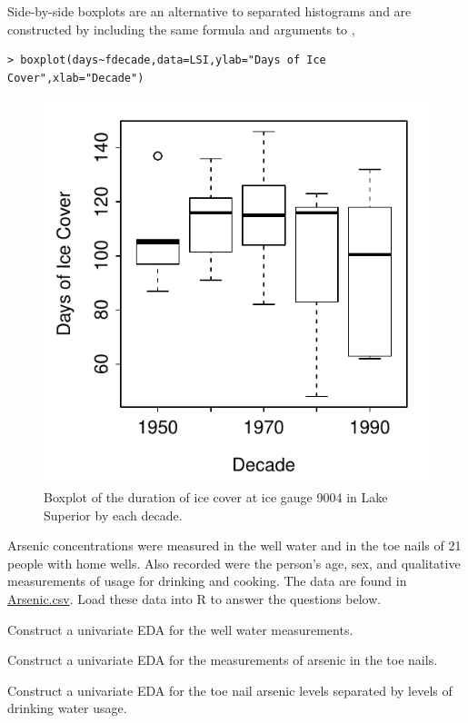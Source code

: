\documentclass[10pt,openany]{book}\usepackage[]{graphicx}\usepackage[]{color}
\makeatletter
\newenvironment{kframe}{%
 \def\at@end@of@kframe{}%
 \ifinner\ifhmode%
  \def\at@end@of@kframe{\end{minipage}}%
  \begin{minipage}{\columnwidth}%
 \fi\fi%
 \def\FrameCommand##1{\hskip\@totalleftmargin \hskip-\fboxsep
 \colorbox{shadecolor}{##1}\hskip-\fboxsep
     \hskip-\linewidth \hskip-\@totalleftmargin \hskip\columnwidth}%
 \MakeFramed {\advance\hsize-\width
   \@totalleftmargin\z@ \linewidth\hsize
   \@setminipage}}%
 {\par\unskip\endMakeFramed%
 \at@end@of@kframe}
\newenvironment{knitrout}{}{} %
\makeatother
\begin{document}
Side-by-side boxplots  are an alternative to separated histograms and are constructed by including the same formula and  arguments to ,

\begin{knitrout}
\color{fgcolor}\begin{kframe}
\begin{verbatim}
> boxplot(days~fdecade,data=LSI,ylab="Days of Ice Cover",xlab="Decade")
\end{verbatim}
\end{kframe}\begin{figure}[hbtp]

{\centering \includegraphics[width=.4\linewidth]{Figs/Boxplot1-1} 

}

\caption[Boxplot of the duration of ice cover at ice gauge 9004 in Lake Superior by each decade]{Boxplot of the duration of ice cover at ice gauge 9004 in Lake Superior by each decade.}\label{fig:Boxplot1}
\end{figure}


\end{knitrout}

\vspace{100pt}
\begin{exsection}
  \item \label{revex:EDAArsenic1} \rhw{} Arsenic concentrations were measured in the well water and in the toe nails of 21 people with home wells.  Also recorded were the person's age, sex, and qualitative measurements of usage for drinking and cooking.  The data are found in \href{https://raw.githubusercontent.com/droglenc/NCData/master/Arsenic.csv}{Arsenic.csv}.  Load these data into R to answer the questions below. 
  \begin{Enumerate}
    \item Construct a univariate EDA for the well water measurements.
    \item Construct a univariate EDA for the measurements of arsenic in the toe nails.
    \item Construct a univariate EDA for the toe nail arsenic levels separated by levels of drinking water usage.
  \end{Enumerate}
\end{exsection}
\end{document}
